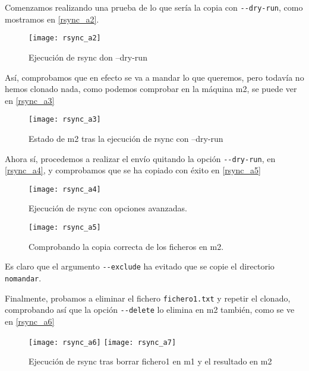Comenzamos realizando una prueba de lo que sería la copia con \verb|--dry-run|, como mostramos en \eqref{rsync_a2}.

\begin{figure}[h!]
\begin{center}
\caption{Ejecución de rsync don --dry-run}
\label{rsync_a2}
\texttt{[image: rsync\_a2]}
\end{center}
\end{figure}

Así, comprobamos que en efecto se va a mandar lo que queremos, pero todavía no hemos clonado nada, como podemos comprobar en la máquina m2, se puede ver en \eqref{rsync_a3}

\begin{figure}[h!]
\begin{center}
\caption{Estado de m2 tras la ejecución de rsync con --dry-run}
\label{rsync_a3}
\texttt{[image: rsync\_a3]}
\end{center}
\end{figure}

Ahora sí, procedemos a realizar el envío quitando la opción \verb|--dry-run|, en \eqref{rsync_a4}, y comprobamos que se ha copiado con éxito en \eqref{rsync_a5}

\begin{figure}[h!]
\begin{center}
\caption{Ejecución de rsync con opciones avanzadas.}
\label{rsync_a4}
\texttt{[image: rsync\_a4]}
\end{center}
\end{figure}

\begin{figure}[h!]
\begin{center}
\caption{Comprobando la copia correcta de los ficheros en m2.}
\label{rsync_a5}
\texttt{[image: rsync\_a5]}
\end{center}
\end{figure}

Es claro que el argumento \verb|--exclude| ha evitado que se copie el directorio \verb|nomandar|.

Finalmente, probamos a eliminar el fichero \verb|fichero1.txt| y repetir el clonado, comprobando así que la opción \verb|--delete| lo elimina en m2 también, como se ve en \eqref{rsync_a6}

\begin{figure}[h!]
\begin{center}
\caption{Ejecución de rsync tras borrar fichero1 en m1 y el resultado en m2}
\label{rsync_a6}
\texttt{[image: rsync\_a6]}
\texttt{[image: rsync\_a7]}
\end{center}
\end{figure}

